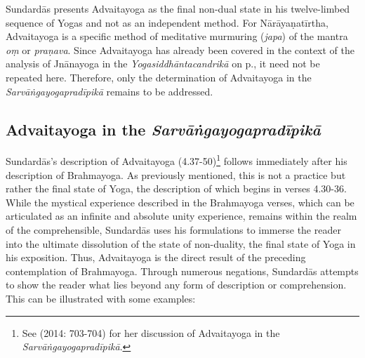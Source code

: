 Sundardās presents Advaitayoga as the final non-dual state in his twelve-limbed sequence of Yogas and not as an independent method. For Nārāyaṇatīrtha, Advaitayoga is a specific method of meditative murmuring (\textit{japa}) of the mantra \textit{oṃ} or \textit{praṇava}. Since Advaitayoga has already been covered in the context of the analysis of Jnānayoga in the \textit{Yogasiddhāntacandrikā} on p.\pageref{jnanayogaintrocandrika}, it need not be repeated here. Therefore, only the determination of Advaitayoga in the \textit{Sarvāṅgayogapradīpikā} remains to be addressed.

\subsection{Advaitayoga in the \textit{Sarvāṅgayogapradīpikā}}
\label{sundaradvaita}

Sundardās's description of Advaitayoga (4.37-50)\footnote{See \citeauthor{burger2014sarvangayogapradipika} (2014: 703-704) for her discussion of Advaitayoga in the \textit{Sarvāṅgayogapradīpikā}.} follows immediately after his description of Brahmayoga. As previously mentioned, this is not a practice but rather the final state of Yoga, the description of which begins in verses 4.30-36. While the mystical experience described in the Brahmayoga verses, which can be articulated as an infinite and absolute unity experience, remains within the realm of the comprehensible, Sundardās uses his formulations to immerse the reader into the ultimate dissolution of the state of non-duality, the final state of Yoga in his exposition. Thus, Advaitayoga is the direct result of the preceding contemplation of Brahmayoga. Through numerous negations, Sundardās attempts to show the reader what lies beyond any form of description or comprehension. This can be illustrated with some examples:

